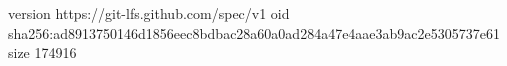 version https://git-lfs.github.com/spec/v1
oid sha256:ad8913750146d1856eec8bdbac28a60a0ad284a47e4aae3ab9ac2e5305737e61
size 174916

